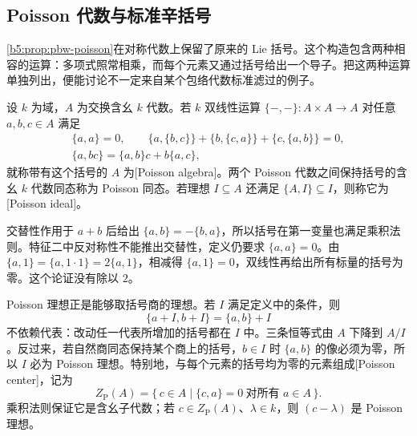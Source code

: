 
\subsection{Poisson 代数与标准辛括号}
\label{b5:subsec:1502:05}

\cref{b5:prop:pbw-poisson}在对称代数上保留了原来的 Lie 括号。这个构造包含两种相容的运算：多项式照常相乘，而每个元素又通过括号给出一个导子。把这两种运算单独列出，便能讨论不一定来自某个包络代数标准滤过的例子。

\begin{definition}\label{b5:def:poisson-algebra}
	设 \(k\) 为域，\(A\) 为交换含幺 \(k\) 代数。若 \(k\) 双线性运算 \(\{-,-\}:A\times A\to A\) 对任意 \(a,b,c\in A\) 满足
	\[
		\begin{gathered}
			\{a,a\}=0,\qquad
			\{a,\{b,c\}\}+\{b,\{c,a\}\}+\{c,\{a,b\}\}=0,\\
			\{a,bc\}=\{a,b\}c+b\{a,c\},
		\end{gathered}
	\]
	就称带有这个括号的 \(A\) 为[Poisson algebra]。两个 Poisson 代数之间保持括号的含幺 \(k\) 代数同态称为 Poisson 同态。若理想 \(I\subseteq A\) 还满足 \(\{A,I\}\subseteq I\)，则称它为[Poisson ideal]。
\end{definition}

交替性作用于 \(a+b\) 后给出 \(\{a,b\}=-\{b,a\}\)，所以括号在第一变量也满足乘积法则。特征二中反对称性不能推出交替性，定义仍要求 \(\{a,a\}=0\)。由 \(\{a,1\}=\{a,1\cdot1\}=2\{a,1\}\)，相减得 \(\{a,1\}=0\)，双线性再给出所有标量的括号为零。这个论证没有除以 \(2\)。

\ProseParagraphBreak
Poisson 理想正是能够取括号商的理想。若 \(I\) 满足定义中的条件，则
\[
	\{a+I,b+I\}=\{a,b\}+I
\]
不依赖代表：改动任一代表所增加的括号都在 \(I\) 中。三条恒等式由 \(A\) 下降到 \(A/I\)。反过来，若自然商同态保持某个商上的括号，\(b\in I\) 时 \(\{a,b\}\) 的像必须为零，所以 \(I\) 必为 Poisson 理想。特别地，与每个元素的括号均为零的元素组成[Poisson center]，记为
\[
	Z_{\mathrm P}(A)=\{\,c\in A\mid \{c,a\}=0\ \text{对所有 }a\in A\,\}.
\]
乘积法则保证它是含幺子代数；若 \(c\in Z_{\mathrm P}(A)\)、\(\lambda\in k\)，则 \((c-\lambda)\) 是 Poisson 理想。

